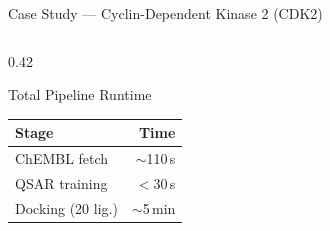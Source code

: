 \begin{frame}{Case Study — Cyclin-Dependent Kinase 2 (CDK2)}
\begin{columns}[T]
\begin{column}{0.42\textwidth}
      \vspace{0.3cm}
      \begin{block}{Total Pipeline Runtime}
        \begin{tabular}{lr}
          \toprule
          Stage & Time \\
          \midrule
          ChEMBL fetch & $\sim$110\,s \\
          QSAR training & $<$30\,s \\
          Docking (20 lig.) & $\sim$5\,min \\
          \bottomrule
        \end{tabular}
      \end{block}
    \end{column}
  \end{columns}
\end{frame}
